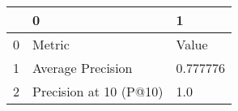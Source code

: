 \begin{tabular}{lll}
\toprule
{} &                       0 &         1 \\
\midrule
0 &                  Metric &     Value \\
1 &       Average Precision &  0.777776 \\
2 &  Precision at 10 (P@10) &       1.0 \\
\bottomrule
\end{tabular}
